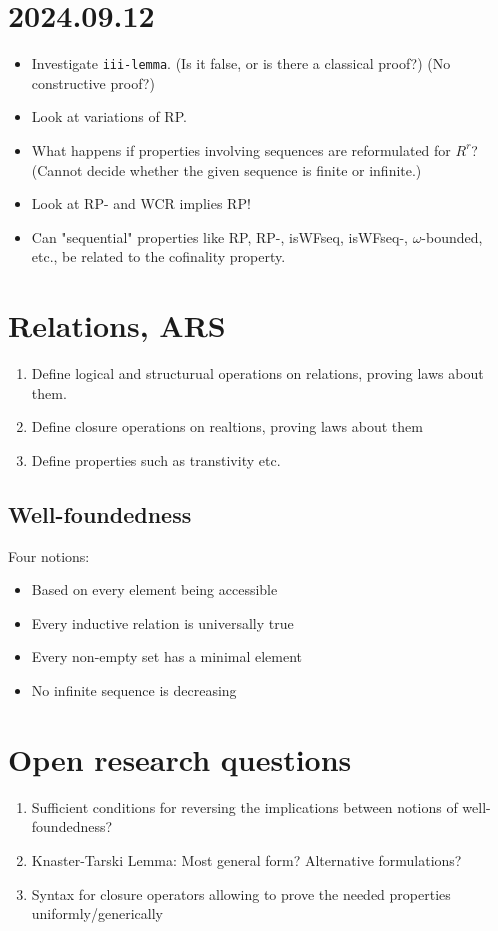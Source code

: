 \documentclass{scrartcl}
\begin{document}
\section{2024.09.12}
\begin{itemize}
  \item Investigate \texttt{iii-lemma}.  (Is it false, or is there a classical proof?)
  (No constructive proof?)
  \item Look at variations of RP.
  \item What happens if properties involving sequences are reformulated for
  $R^r$? (Cannot decide whether the given sequence is finite or infinite.)
  \item Look at RP- and WCR implies RP!
  \item Can "sequential" properties like RP, RP-, isWFseq, isWFseq-, $\omega$-bounded, etc.,
  be related to the cofinality property.
\end{itemize}

\section{Relations, ARS}


\begin{enumerate}
  \item Define logical and structurual operations on relations, proving laws about them.
  \item Define closure operations on realtions, proving laws about them
  \item Define properties such as transtivity etc.
\end{enumerate}

\subsection{Well-foundedness}

Four notions:
\begin{itemize}
  \item Based on every element being accessible
  \item Every inductive relation is universally true
  \item Every non-empty set has a minimal element
  \item No infinite sequence is decreasing
\end{itemize}



\section{Open research questions}
\begin{enumerate}
  \item Sufficient conditions for reversing the implications between notions of
  well-foundedness?
  \item Knaster-Tarski Lemma: Most general form? Alternative formulations?
  \item Syntax for closure operators allowing to prove the needed properties
  uniformly/generically
\end{enumerate}
\end{document}
